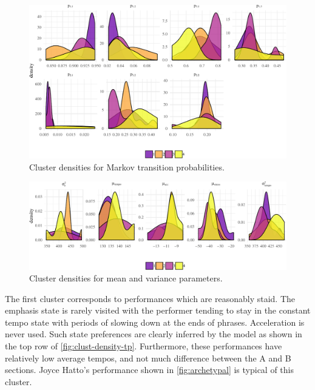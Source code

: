 \documentclass[aoas]{imsart}
\begin{document}
\begin{figure}[t]
  \centering
  \includegraphics[width=.9\linewidth]{clust-densities-sub2-1}
  \caption{Cluster densities for Markov transition probabilities.}
  \label{fig:clust-density-tp}
\end{figure}
\begin{figure}[t]
  \centering
  \includegraphics[width=.9\linewidth]{clust-densities-sub1-1}
  \caption{Cluster densities for mean and variance parameters.}
  \label{fig:clust-density-mv}
\end{figure}
The first cluster corresponds to performances which are reasonably
staid. The emphasis state is rarely visited with the performer tending
to stay in the constant tempo state with periods of slowing down at
the ends of phrases. Acceleration is never used. Such state
preferences are clearly inferred by the model as shown in the
top row of \autoref{fig:clust-density-tp}. Furthermore, these
performances have relatively low average tempos, and not much
difference between the A and B sections. Joyce Hatto's performance
shown in \autoref{fig:archetypal} is typical of this cluster.
\end{document}
